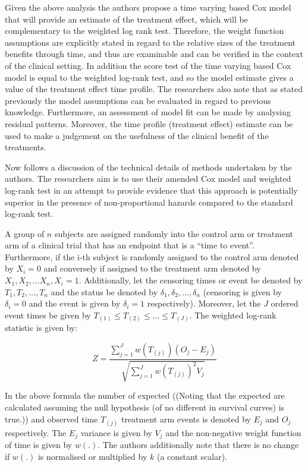 \documentclass[12pt,twoside]{reedthesis}
\begin{document}
Given the above analysis the authors propose a time varying based Cox model that will provide an estimate of the treatment effect, which will be complementary to the weighted log rank test. Therefore, the weight function assumptions are explicitly stated in regard to the relative sizes of the treatment benefits through time, and thus are examinable and can be verified in the context of the clinical setting. In addition the score test of the time varying based Cox model is equal to the weighted log-rank test, and so the model estimate gives a value of the treatment effect time profile. The researchers also note that as stated previously the model assumptions can be evaluated in regard to previous knowledge. Furthermore, an assessment of model fit can be made by analysing residual patterns. Moreover, the time profile (treatment effect) estimate can be used to make a judgement on the usefulness of the clinical benefit of the treatments.

Now follows a discussion of the technical details of methods undertaken by the authors. The researchers aim is to use their amended Cox model and weighted log-rank test in an attempt to provide evidence that this approach is potentially superior in the presence of non-proportional hazards compared to the standard log-rank test.

A group of \(\textit{n}\) subjects are assigned randomly into the control arm or treatment arm of a clinical trial that has an endpoint that is a ``time to event''. Furthermore, if the i-th subject is randomly assigned to the control arm denoted by \(X_{i}=0\) and conversely if assigned to the treatment arm denoted by \(X_{1}, X_{2}, \dots X_{n}, X_{i}=1\). Additionally, let the censoring times or event be denoted by \(T_{1}, T_{2}, \dots, T_{n}\) and the status be denoted by \(\delta_{1}, \delta_{2}, \dots, \delta_{n}\) (censoring is given by \(\delta_{i}=0\) and the event is given by \(\delta_{i}=1\) respectively). Moreover, let the \(\textit{J}\) ordered event times be given by \(T_{(1)} \leq T_{(2)} \leq \ldots \leq T_{(J)}\). The weighted log-rank statistic is given by:

\[Z=\frac{\sum_{j=1}^{J} w\left(T_{(j)}\right)\left(O_{j}-E_{j}\right)}{\sqrt{\sum_{j=1}^{J} w\left(T_{(j)}\right)^{2} V_{j}}}\]

In the above formula the number of expected ((Noting that the expected are calculated assuming the null hypothesis (of no different in survival curves) is true.)) and observed time \(T_{(j)}\) treatment arm events is denoted by \(E_{j}\) and \(O_{j}\) respectively. The \(E_{j}\) variance is given by \(V_{j}\) and the non-negative weight function of time is given by \(w( .)\). The authors additionally note that there is no change if \(w( .)\) is normalised or multiplied by \(\textit{k}\) (a constant scalar).
\end{document}
